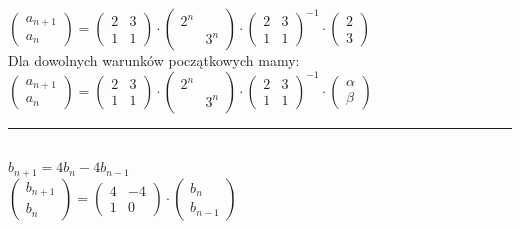 \documentclass[10pt]{article}
\theoremstyle{definition}
\theoremstyle{definition}
\theoremstyle{definition}
\theoremstyle{definition}
\theoremstyle{remark}
\theoremstyle{definition}
\theoremstyle{definition}
\theoremstyle{definition}
\theoremstyle{definition}
\theoremstyle{definition}
\begin{document}
$\begin{pmatrix} 
    a_{n+1} \\ a_n
    \end{pmatrix} = \begin{pmatrix} 2 & 3 \\ 1 & 1 \end{pmatrix} 
    \cdot \begin{pmatrix} 2^n &  \\  & 3^n \end{pmatrix} 
    \cdot \begin{pmatrix} 2 & 3 \\ 1 & 1 \end{pmatrix}^{-1}
    \cdot \begin{pmatrix} 2 \\ 3 \end{pmatrix}$ \\
Dla dowolnych warunków początkowych mamy: \\
$\begin{pmatrix} 
    a_{n+1} \\ a_n
    \end{pmatrix} = \begin{pmatrix} 2 & 3 \\ 1 & 1 \end{pmatrix} 
    \cdot \begin{pmatrix} 2^n &  \\  & 3^n \end{pmatrix} 
    \cdot \begin{pmatrix} 2 & 3 \\ 1 & 1 \end{pmatrix}^{-1}
    \cdot \begin{pmatrix} \alpha \\ \beta \end{pmatrix}$ \\
\noindent\rule{\textwidth}{0.4pt}\\ 
$b_{n+1} = 4 b_n - 4 b_{n-1}$ \\
$\begin{pmatrix} 
    b_{n+1} \\ b_n
    \end{pmatrix} = \begin{pmatrix} 4 & -4 \\ 1 & 0 \end{pmatrix} \cdot \begin{pmatrix} b_n \\ b_{n-1}
    \end{pmatrix}$ \\ 
\end{document}

